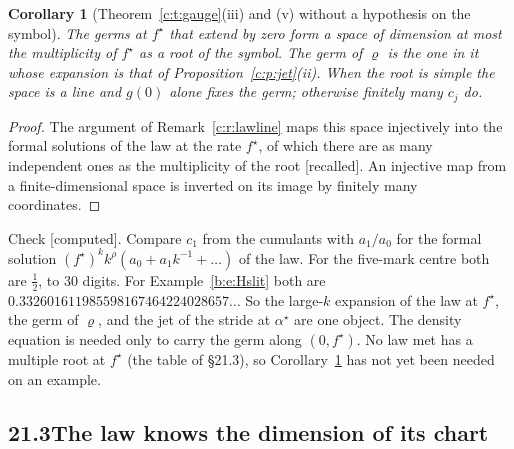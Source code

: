 \documentclass[11pt]{article}
\theoremstyle{plain}
\newtheorem{corollary}[proposition]{Corollary}
\theoremstyle{definition}
\theoremstyle{remark}
\newcommand{\computed}{\textup{[computed]}}
\newcommand{\recalled}{\textup{[recalled]}}
\begin{document}
\begin{corollary}[Theorem~\ref{c:t:gauge}(iii) and (v) without a hypothesis on the symbol]\label{c:c:multiple}
The germs at $f^\star$ that extend by zero form a space of dimension at most the multiplicity of $f^\star$ as a root of the symbol. The germ of $\varrho$ is the one in it whose expansion is that of Proposition~\ref{c:p:jet}(ii). When the root is simple the space is a line and $g(0)$ alone fixes the germ; otherwise finitely many $c_j$ do.
\end{corollary}

\begin{proof}
The argument of Remark~\ref{c:r:lawline} maps this space injectively into the formal solutions of the law at the rate $f^\star$, of which there are as many independent ones as the multiplicity of the root \recalled. An injective map from a finite-dimensional space is inverted on its image by finitely many coordinates.
\end{proof}

\noindent Check \computed. Compare $c_1$ from the cumulants with $a_1/a_0$ for the formal solution $(f^\star)^kk^\rho(a_0+a_1k^{-1}+\dots)$ of the law. For the five-mark centre both are $\frac12$, to $30$ digits. For Example~\ref{b:e:Hslit} both are $0.332601611985598167464224028657\ldots$ So the large-$k$ expansion of the law at $f^\star$, the germ of $\varrho$, and the jet of the stride at $\alpha^\star$ are one object. The density equation is needed only to carry the germ along $(0,f^\star)$. No law met has a multiple root at $f^\star$ (the table of \S21.3), so Corollary~\ref{c:c:multiple} has not yet been needed on an example.


\subsection*{21.3\quad The law knows the dimension of its chart}
\end{document}
